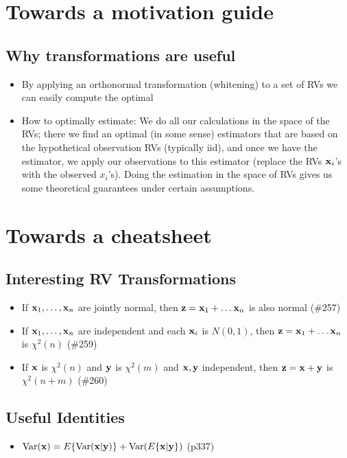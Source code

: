 \documentclass[a4paper, oneside]{book}
\begin{document}
\chapter*{Towards a motivation guide}
\section{Why transformations are useful}
\begin{itemize}
\item By applying an orthonormal transformation (\aka whitening) to a set of RVs we can easily compute the optimal 
\item How to optimally estimate: We do all our calculations in the space of the RVs; there we find an optimal (in some sense) estimators that are based on the hypothetical observation RVs (typically iid), and once we have the estimator, we apply our observations to this estimator (\ie replace the RVs $\mathbf{x}_i$'s with the observed $x_i$'s). Doing the estimation in the space of RVs gives us some theoretical guarantees under certain assumptions.
\end{itemize}

\chapter*{Towards a cheatsheet}
\section{Interesting RV Transformations}
\begin{itemize}
\item If $\mathbf{x}_1, \hdots, \mathbf{x}_n$ are jointly normal, then $\mathbf{z} = \mathbf{x}_1 + \hdots \mathbf{x}_n$ is also normal (\#257)
\item If $\mathbf{x}_1, \hdots, \mathbf{x}_n$ are independent and each $\mathbf{x}_i$ is $N(0,1)$, then $\mathbf{z} = \mathbf{x}_1 + \hdots \mathbf{x}_n$ is $\chi^2(n)$ (\#259)
\item If $\mathbf{x}$ is $\chi^2(n)$ and $\mathbf{y}$ is $\chi^2(m)$ and $\mathbf{x,y}$ independent, then $\mathbf{z} = \mathbf{x+y}$ is $\chi^2(n+m)$ (\#260)
\end{itemize}

\section{Useful Identities}
\begin{itemize}
\item $\text{Var}(\mathbf{x}) = E\{\text{Var}(\mathbf{x|y})\} + \text{Var}(E\{\mathbf{x|y}\})$ (p337)
\end{itemize}
\end{document}
